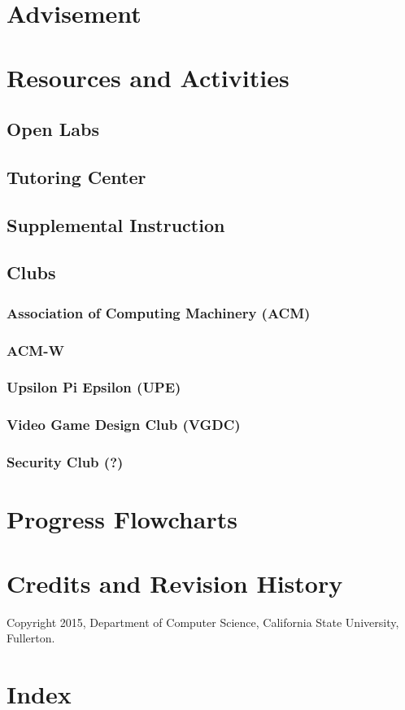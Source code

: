 \documentclass{book}
\begin{document}
\chapter{Advisement}

\chapter{Resources and Activities}

\section{Open Labs}

\section{Tutoring Center}

\section{Supplemental Instruction}

\section{Clubs}
\subsection{Association of Computing Machinery (ACM)}

\subsection{ACM-W}

\subsection{Upsilon Pi Epsilon (UPE)}
\subsection{Video Game Design Club (VGDC)}
\subsection{Security Club (?)}

\chapter{Progress Flowcharts}

\chapter{Credits and Revision History}

Copyright 2015, Department of Computer Science, California State University, Fullerton.

\chapter{Index}
\printindex
\end{document}

